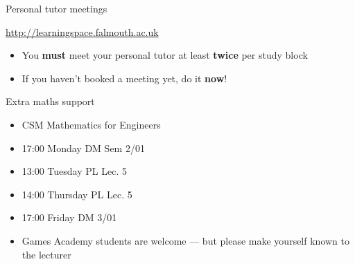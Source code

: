 \begin{frame}{Personal tutor meetings}
	\begin{center}
		\url{http://learningspace.falmouth.ac.uk}
	\end{center}
	\begin{itemize}
		\item You \textbf{must} meet your personal tutor at least \textbf{twice} per study block
		\item If you haven't booked a meeting yet, do it \textbf{now}!
	\end{itemize}
\end{frame}

\begin{frame}{Extra maths support}
	\begin{itemize}
		\pause\item CSM Mathematics for Engineers
		\pause\item 17:00 Monday DM Sem 2/01
		\item 13:00 Tuesday PL Lec. 5
		\item 14:00 Thursday PL Lec. 5
		\item 17:00 Friday DM 3/01
		\pause\item Games Academy students are welcome --- but please make yourself known to the lecturer
	\end{itemize}
\end{frame}

